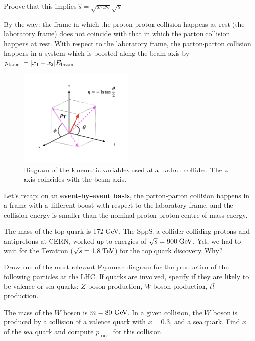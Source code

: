 \begin{mybox}
\begin{ExerciseList}
\Exercise Proove that this implies $\hat{s} = \sqrt{x_1 x_2} \sqrt{s}$
\end{ExerciseList}
\end{mybox}

By the way: the frame in which the proton-proton collision happens at rest (the laboratory frame) does not coincide with that in which the parton collision happens at rest. With respect to the laboratory frame, the parton-parton collision happens in a system which is boosted along the beam axis by $p_{\mathrm{boost}} = |x_1-x_2| E_{\mathrm{beam}}$.

 \begin{figure}[!h]
\begin{center}
\includegraphics[width=0.5\textwidth]{./Figures/collider_physics_variables.png}
\end{center}
\caption{Diagram of the kinematic variables used at a hadron collider. The $z$ axis coincides with the beam axis.}
\label{fig:collider_variables}
\end{figure}


Let's recap: on an \textbf{event-by-event basis}, the parton-parton collision happens in a frame with a different boost with respect to the laboratory frame, and the collision energy is smaller than the nominal proton-proton centre-of-mass energy. 

\begin{mybox}
\begin{ExerciseList}
\Exercise The mass of the top quark is 172 GeV. The SppS, a collider colliding protons and antiprotons at CERN, worked up to energies of $\sqrt{s} = 900\ \text{Ge\kern -0.1em V}$. Yet, we had to wait for the Tevatron ($\sqrt{s} = 1.8\ \TeV$) for the top quark discovery. Why?

\Exercise Draw one of the most relevant Feynman diagram for the production of the following particles at the LHC. If quarks are involved, specify if they are likely to be valence or sea quarks: $Z$ boson production, $W$ boson production, $t\bar{t}$ production.

\Exercise The mass of the $W$ boson is $m = 80\ \text{Ge\kern -0.1em V}$. In a given collision, the $W$ boson is produced by a collision of a valence quark with $x = 0.3$,  and a sea quark. Find $x$ of the sea quark and compute $p_{\mathrm{boost}}$ for this collision.
\end{ExerciseList}
\end{mybox}

